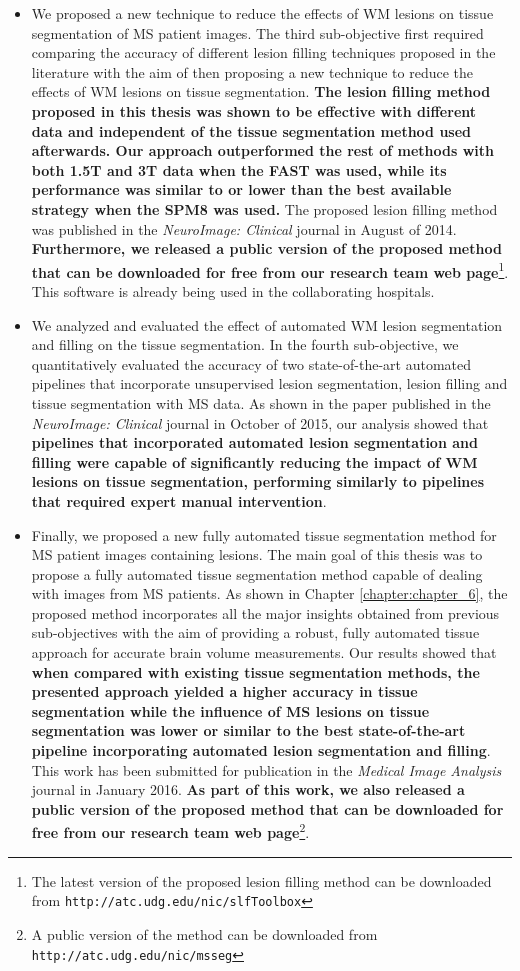\begin{itemize}
\item We proposed a new technique to reduce the effects of WM lesions on tissue segmentation of MS patient images. The third sub-objective first required comparing the accuracy of different  lesion filling techniques proposed in the literature with the aim of then proposing a new technique to reduce the effects of WM lesions on tissue segmentation. \textbf{The lesion filling method proposed in this thesis was shown to be effective with different data and independent of the tissue segmentation method used afterwards. Our approach outperformed the rest of methods with both 1.5T and 3T data when the FAST was used, while its performance was similar to or lower than the best available strategy when the SPM8 was used.} The proposed lesion filling method was  published in the\textit{ NeuroImage: Clinical} journal in August of 2014. \textbf{Furthermore, we released a public version of the proposed method that can be downloaded for free from our research team web page}\footnote{The latest version of the proposed lesion filling method can be downloaded from \texttt{http://atc.udg.edu/nic/slfToolbox}}. This software is already being used in the collaborating hospitals.  

\item We analyzed and evaluated the effect of automated WM lesion segmentation and filling on the tissue segmentation. In the fourth sub-objective, we quantitatively evaluated the accuracy of two state-of-the-art automated pipelines that incorporate unsupervised lesion segmentation, lesion filling and tissue segmentation with MS data.  As shown in the paper published in the \textit{NeuroImage: Clinical} journal in October of 2015, our analysis showed that \textbf{pipelines that incorporated automated lesion segmentation and filling were capable of significantly reducing the impact of WM lesions on tissue segmentation, performing similarly to pipelines that required expert manual intervention}.

\item Finally, we proposed a new fully automated tissue segmentation method for MS patient images containing lesions. The main goal of this thesis was to propose a fully automated tissue segmentation method capable of dealing with images from MS patients. As shown in Chapter \ref{chapter:chapter_6}, the proposed method incorporates all the major insights obtained from previous sub-objectives with the aim of providing a robust, fully automated tissue approach for accurate brain volume measurements. Our results showed that  \textbf{when compared with existing tissue segmentation methods, the presented approach yielded a higher accuracy in tissue segmentation while the influence of MS lesions on tissue segmentation was lower or similar to the best state-of-the-art pipeline incorporating automated lesion segmentation and filling}. This work has been submitted for publication in the\textit{ Medical Image Analysis} journal in January 2016. \textbf{As part of this work, we also released a public version of the proposed method that can be downloaded for free from our research team web page}\footnote{A public version of the method can be downloaded from \texttt{http://atc.udg.edu/nic/msseg}}.


\end{itemize}
